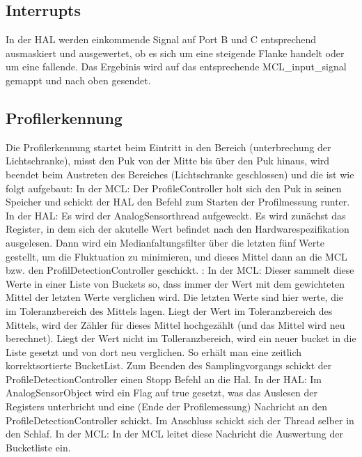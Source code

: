 \documentclass[
   draft=false
  ,paper=a4
  ,twoside=true
  ,fontsize=11pt
  ,headsepline
  ,DIV11
  ,parskip=full+
]{scrartcl} %
\begin{document}
\subsection{Interrupts}
In der HAL werden einkommende Signal auf Port B und C entsprechend ausmaskiert und ausgewertet, ob es sich um eine steigende Flanke handelt oder um eine fallende. Das Ergebinis wird auf das entsprechende MCL\_input\_signal gemappt und nach oben gesendet.

\subsection{Profilerkennung}
Die Profilerkennung startet beim Eintritt in den Bereich (unterbrechung der Lichtschranke), misst den Puk von der Mitte bis über den Puk hinaus, wird beendet beim Austreten des Bereiches (Lichtschranke geschlossen) und die ist wie folgt aufgebaut: 
\newline
In der MCL:
Der ProfileController holt sich den Puk in seinen Speicher und schickt der HAL den Befehl zum Starten der Profilmessung runter.
\newline
In der HAL:
Es wird der AnalogSensorthread aufgeweckt.
Es wird zunächst das Register, in dem sich der akutelle Wert befindet nach den
Hardwarespezifikation ausgelesen. Dann wird ein Medianfaltungsfilter über die letzten fünf Werte gestellt, um die Fluktuation zu minimieren, und dieses Mittel dann an die MCL bzw. den ProfilDetectionController geschickt.
\newline:
In der MCL:
Dieser sammelt diese Werte in einer Liste von Buckets so, dass immer der Wert mit dem gewichteten Mittel der letzten Werte verglichen wird. Die letzten Werte sind hier werte, die im Toleranzbereich des Mittels lagen. Liegt der Wert im Toleranzbereich des Mittels, wird der Zähler für dieses Mittel hochgezählt (und das Mittel wird neu berechnet). Liegt der Wert nicht im Tolleranzbereich, wird ein neuer bucket in die Liste gesetzt und von dort neu verglichen. So erhält man eine zeitlich korrektsortierte BucketList. 
Zum Beenden des Samplingvorgangs schickt der ProfileDetectionController einen Stopp Befehl an die Hal.
\newline
In der HAL:
Im AnalogSensorObject wird ein Flag auf true gesetzt, was das Auslesen der Registers unterbricht und eine (Ende der Profilemessung) Nachricht an den ProfileDetectionController schickt. Im Anschluss schickt sich der Thread selber in den Schlaf.
\newline
In der MCL:
In der MCL leitet diese Nachricht die Auswertung der Bucketliste ein.
\end{document}
